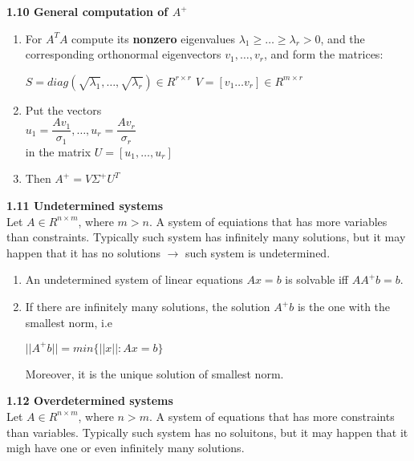 \documentclass{article}
\begin{document}
\begin{multicols}{2}
	\textbf{1.10 General computation of $A^+$}
	\begin{enumerate}
		\item For $A^TA$ compute its \textbf{nonzero} eigenvalues
		      $\lambda_1 \geq \dots \geq \lambda_r > 0$, and the corresponding
		      orthonormal eigenvectors $v_1, \dots, v_r$, and form the matrices:
		      \begin{center}
			      \begin{math}
				      S = diag(\sqrt{\lambda_1}, \dots, \sqrt{\lambda_r}) \in R^{r \times r}
			      \end{math}
			      \begin{math}
				      V = [v_1 \dots v_r] \in R^{m \times r}
			      \end{math}
		      \end{center}
		\item Put the vectors \\
		      \begin{math}
			      u_1 = \dfrac{Av_1}{\sigma_1}, \dots, u_r = \dfrac{Av_r}{\sigma_r}
		      \end{math}\\
		      in the matrix $U = [u_1, \dots, u_r]$
		\item Then $A^+ = V \Sigma^+ U^T$
	\end{enumerate}

	\textbf{1.11 Undetermined systems}\\
	Let $A \in R^{n \times m}$, where $m > n$. A system of equiations that has more variables than
	constraints. Typically such system has infinitely many solutions, but it may happen that it has no
	solutions $\rightarrow$ such system is undetermined.
	\begin{enumerate}
		\item An undetermined system of linear equations $Ax=b$ is solvable iff $AA^+b = b$.
		\item If there are infinitely many solutions, the solution $A^+b$ is the one with the
		      smallest norm, i.e
		      \begin{center}
			      \begin{math}
				      || A^+ b || = min\{||x||: Ax = b\}
			      \end{math}
		      \end{center}
		      Moreover, it is the unique solution of smallest norm.
	\end{enumerate}

	\textbf{1.12 Overdetermined systems}\\
	Let $A \in R^{n \times m}$, where $n > m$. A system of equations that has more constraints than
	variables. Typically such system has no soluitons, but it may happen that it migh have one or
	even infinitely many solutions.


\end{multicols}
\end{document}
